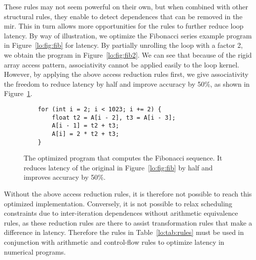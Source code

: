 These rules may not seem powerful on their own, but when combined with other
structural rules, they enable \soap{} to detect dependences that can be removed
in the \gls{mir}\@.  This in turn allows more opportunities for the rules
to further reduce loop latency.  By way of illustration, we optimize the
Fibonacci series example program in Figure~\ref{lo:fig:fib} for latency.
By partially unrolling the loop with a factor 2, we obtain the program in
Figure~\ref{lo:fig:fib2}.  We can see that because of the rigid array access
pattern, associativity cannot be applied easily to the loop kernel.  However,
by applying the above access reduction rules first, we give associativity the
freedom to reduce latency by half and improve accuracy by 50\%, as shown in
Figure~\ref{lo:lst:fib_opt}.
\begin{figure}[ht]
    \centering
    \begin{lstlisting}
    for (int i = 2; i < 1023; i += 2) {
        float t2 = A[i - 2], t3 = A[i - 3];
        A[i - 1] = t2 + t3;
        A[i] = 2 * t2 + t3;
    }
    \end{lstlisting}
    \caption{%
        The optimized program that computes the Fibonacci sequence.  It reduces
        latency of the original in Figure~\ref{lo:fig:fib} by half and improves
        accuracy by 50\%.
    }\label{lo:lst:fib_opt}
\end{figure}

Without the above access reduction rules, it is therefore not possible to
reach this optimized implementation.  Conversely, it is not possible to
relax scheduling constraints due to inter-iteration dependences without
arithmetic equivalence rules, as these reduction rules are there to assist
transformation rules that make a difference in latency.  Therefore the rules
in Table~\ref{lo:tab:rules} must be used in conjunction with arithmetic and
control-flow rules to optimize latency in numerical programs.
